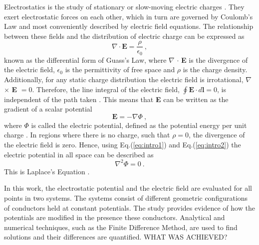 \documentclass[a4paper]{jpconf}
\begin{document}
Electrostatics is the study of stationary or slow-moving electric charges \cite{griffiths-introElec}. They exert electrostatic forces on each other, which in turn are governed by Coulomb's Law and most conveniently described by electric field equations. The relationship between these fields and the distribution of electric charge can be expressed as \cite{griffiths-introElec}
\begin{equation}
\textbf{$\nabla$} \cdot \textbf{E} = \frac{\rho}{\epsilon_0}~,
\label{eq:intro1}
\end{equation} known as the differential form of Guass's Law, where \textbf{$\nabla$} $\cdot$ \textbf{E} is the divergence of the electric field, $\epsilon_0$ is the permittivity of free space and $\rho$ is the charge density. Additionally, for any static charge distribution the electric field is irrotational, \textbf{$\nabla$} $\times$ \textbf{E} $= 0$. Therefore, the line integral of the electric field, $\oint \textbf{E} \cdot d \textbf{l} = 0$, is independent of the path taken \cite{griffiths-introElec}. This means that \textbf{E} can be written as the gradient of a scalar potential 
\begin{equation}
\textbf{E} = - \nabla \Phi~,
\label{eq:intro2}
\end{equation} where $\Phi$ is called the electric potential, defined as the potential energy per unit charge  \cite{Sears.Zamansky-uniPhy}.
In regions where there is no charge, such that $\rho = 0$, the divergence of the electric field is zero. Hence, using Eq.(\ref{eq:intro1}) and Eq.(\ref{eq:intro2}) the electric potential in all space can be described as
\begin{equation}
\nabla^2 \Phi = 0~.
\label{eq:intro3}
\end{equation} This is Laplace's Equation \cite{RHB-MathematicalMethods}.\\ \par
In this work, the electrostatic potential and the electric field are evaluated for all points in two systems. The systems consist of different geometric configurations of conductors held at constant potentials. The study provides evidence of how the potentials are modified in the presence these conductors. Analytical and numerical techniques, such as the Finite Difference Method, are used to find solutions and their differences are quantified. WHAT WAS ACHIEVED? \\ \par
\end{document}
